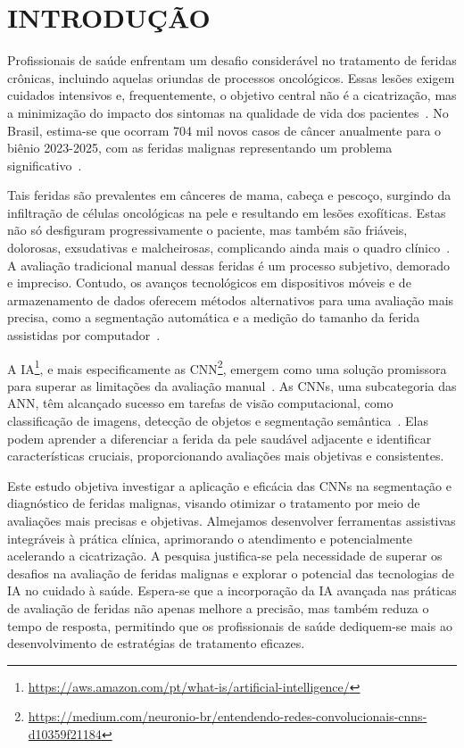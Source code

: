 \section{INTRODUÇÃO}

Profissionais de saúde enfrentam um desafio considerável no tratamento de feridas crônicas, incluindo aquelas oriundas de processos oncológicos. Essas lesões exigem cuidados intensivos e, frequentemente, o objetivo central não é a cicatrização, mas a minimização do impacto dos sintomas na qualidade de vida dos pacientes~\cite{freitas2017intervenccoes, agra2017neoplastic}. No Brasil, estima-se que ocorram 704 mil novos casos de câncer anualmente para o biênio 2023-2025, com as feridas malignas representando um problema significativo~\cite{de2023estimativa}.

Tais feridas são prevalentes em cânceres de mama, cabeça e pescoço, surgindo da infiltração de células oncológicas na pele e resultando em lesões exofíticas. Estas não só desfiguram progressivamente o paciente, mas também são friáveis, dolorosas, exsudativas e malcheirosas, complicando ainda mais o quadro clínico~\cite{de2015manejo}. A avaliação tradicional manual dessas feridas é um processo subjetivo, demorado e impreciso. Contudo, os avanços tecnológicos em dispositivos móveis e de armazenamento de dados oferecem métodos alternativos para uma avaliação mais precisa, como a segmentação automática e a medição do tamanho da ferida assistidas por computador~\cite{scebba2022detect}.

A \ac{IA}\footnote{\url{https://aws.amazon.com/pt/what-is/artificial-intelligence/}}, e mais especificamente as \ac{CNN}\footnote{\url{https://medium.com/neuronio-br/entendendo-redes-convolucionais-cnns-d10359f21184}}, emergem como uma solução promissora para superar as limitações da avaliação manual~\cite{litjens2017, lundervold2019, esteva2019}. As \acp{CNN}, uma subcategoria das \ac{ANN}, têm alcançado sucesso em tarefas de visão computacional, como classificação de imagens, detecção de objetos e segmentação semântica~\cite{sun2023convolution}. Elas podem aprender a diferenciar a ferida da pele saudável adjacente e identificar características cruciais, proporcionando avaliações mais objetivas e consistentes.

Este estudo objetiva investigar a aplicação e eficácia das \acp{CNN} na segmentação e diagnóstico de feridas malignas, visando otimizar o tratamento por meio de avaliações mais precisas e objetivas. Almejamos desenvolver ferramentas assistivas integráveis à prática clínica, aprimorando o atendimento e potencialmente acelerando a cicatrização. A pesquisa justifica-se pela necessidade de superar os desafios na avaliação de feridas malignas e explorar o potencial das tecnologias de \ac{IA} no cuidado à saúde. Espera-se que a incorporação da \ac{IA} avançada nas práticas de avaliação de feridas não apenas melhore a precisão, mas também reduza o tempo de resposta, permitindo que os profissionais de saúde dediquem-se mais ao desenvolvimento de estratégias de tratamento eficazes.




